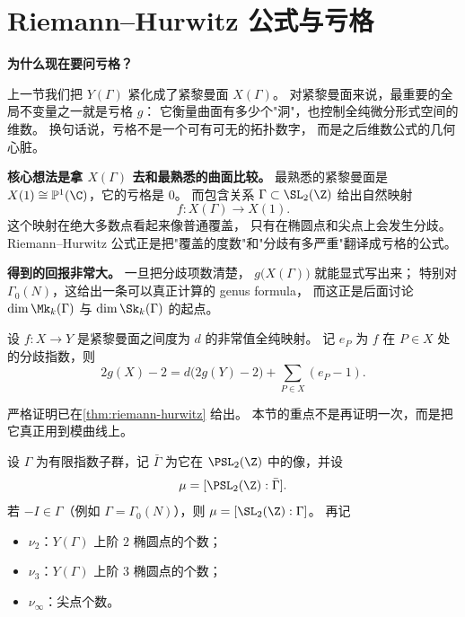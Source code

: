 \section{Riemann--Hurwitz 公式与亏格}
\label{sec:riemann-hurwitz}

\textbf{为什么现在要问亏格？}

上一节我们把 $Y(\Gamma)$ 紧化成了紧黎曼面 $X(\Gamma)$。
对紧黎曼面来说，最重要的全局不变量之一就是亏格 $g$：
它衡量曲面有多少个"洞"，也控制全纯微分形式空间的维数。
换句话说，亏格不是一个可有可无的拓扑数字，
而是之后维数公式的几何心脏。

\textbf{核心想法是拿 $X(\Gamma)$ 去和最熟悉的曲面比较。}
最熟悉的紧黎曼面是
$X(1)\cong\mathbb{P}^1(\C)$，它的亏格是 $0$。
而包含关系 $\Gamma\subset \SL_2(\Z)$ 给出自然映射
\[
  f\colon X(\Gamma)\longrightarrow X(1).
\]
这个映射在绝大多数点看起来像普通覆盖，
只有在椭圆点和尖点上会发生分歧。
Riemann--Hurwitz 公式正是把"覆盖的度数"和"分歧有多严重"翻译成亏格的公式。

\textbf{得到的回报非常大。}
一旦把分歧项数清楚，
$g\bigl(X(\Gamma)\bigr)$ 就能显式写出来；
特别对 $\Gamma_0(N)$，这给出一条可以真正计算的 genus formula，
而这正是后面讨论 $\dim \Mk_k(\Gamma)$ 与 $\dim \Sk_k(\Gamma)$ 的起点。

\begin{theorem}
\label{thm:riemann-hurwitz-recall}
设 $f\colon X\to Y$ 是紧黎曼面之间度为 $d$ 的非常值全纯映射。
记 $e_P$ 为 $f$ 在 $P\in X$ 处的分歧指数，则
\[
  2g(X)-2=d\bigl(2g(Y)-2\bigr)+\sum_{P\in X}(e_P-1).
\]
\end{theorem}

\begin{remark}
严格证明已在\cref{thm:riemann-hurwitz} 给出。
本节的重点不是再证明一次，而是把它真正用到模曲线上。
\end{remark}



\begin{definition}[模曲线亏格公式中的记号]
\label{def:genus-formula-notation}
设 $\Gamma$ 为有限指数子群，记 $\bar\Gamma$ 为它在 $\PSL_2(\Z)$ 中的像，并设
\[
  \mu=[\PSL_2(\Z):\bar\Gamma].
\]
若 $-I\in\Gamma$（例如 $\Gamma=\Gamma_0(N)$），则 $\mu=[\SL_2(\Z):\Gamma]$。
再记
\begin{itemize}
  \item $\nu_2$：$Y(\Gamma)$ 上阶 $2$ 椭圆点的个数；
  \item $\nu_3$：$Y(\Gamma)$ 上阶 $3$ 椭圆点的个数；
  \item $\nu_\infty$：尖点个数。
\end{itemize}
\end{definition}


